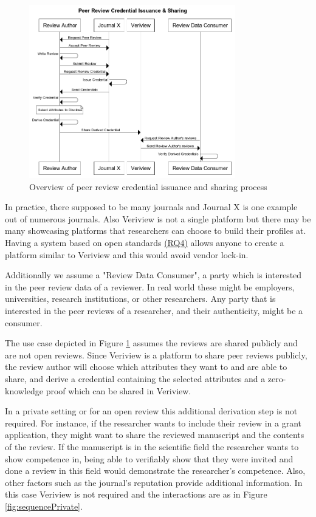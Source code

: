\begin{figure}[htpb]
  \centering
  \includegraphics[width=0.8\textwidth]{figures/sequence.png}
  \caption{Overview of peer review credential issuance and sharing process} \label{fig:sequence1}
\end{figure}

In practice, there supposed to be many journals and Journal X is one example out of numerous journals. Also Veriview is not a single platform but there may be many showcasing platforms that researchers can choose to build their profiles at. Having a system based on open standards \hyperref[rq:open-standards]{(RQ4)} allows anyone to create a platform similar to Veriview and this would avoid vendor lock-in. 

Additionally we assume a "Review Data Consumer", a party which is interested in the peer review data of a reviewer. In real world these might be employers, universities, research institutions, or other researchers. Any party that is interested in the peer reviews of a researcher, and their authenticity, might be a consumer. 

The use case depicted in Figure \ref{fig:sequence1} assumes the reviews are shared publicly and are not open reviews. Since Veriview is a platform to share peer reviews publicly, the review author will choose which attributes they want to and are able to share, and derive a credential containing the selected attributes and a zero-knowledge proof which can be shared in Veriview. 

In a private setting or for an open review this additional derivation step is not required. For instance, if the researcher wants to include their review in a grant application, they might want to share the reviewed manuscript and the contents of the review. If the manuscript is in the scientific field the researcher wants to show competence in, being able to verifiably show that they were invited and done a review in this field  would demonstrate the researcher's competence. Also, other factors such as the journal's reputation provide additional information. In this case Veriview is not required and the interactions are as in Figure \ref{fig:sequencePrivate}.

